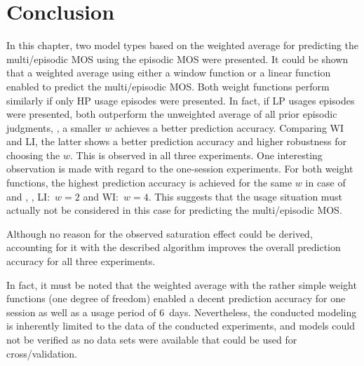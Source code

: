 


\section{Conclusion}
In this chapter, two model types based on the weighted average for predicting the multi\-/episodic \ac{MOS} using the episodic \ac{MOS} were presented.
It could be shown that a weighted average using either a window function or a linear function enabled to predict the multi\-/episodic \ac{MOS}.
Both weight functions perform similarly if only \ac{HP} usage episodes were presented.
In fact, if \ac{LP} usages episodes were presented, both outperform the unweighted average of all prior episodic judgments, \ie, a smaller $\mathit{w}$ achieves a better prediction accuracy.
Comparing WI and LI, the latter shows a better prediction accuracy and higher robustness for choosing the $\mathit{w}$.
This is observed in all three experiments.
One interesting observation is made with regard to the one-session experiments.
For both weight functions, the highest prediction accuracy is achieved for the same $\mathit{w}$ in case of  and \EIIa{}, \ie, LI:~$\mathit{w}=2$ and WI:~$\mathit{w}=4$.
This suggests that the usage situation must actually not be considered in this case for predicting the multi\-/episodic \ac{MOS}.

Although no reason for the observed saturation effect could be derived, accounting for it with the described algorithm improves the overall prediction accuracy for all three experiments.

In fact, it must be noted that the weighted average with the rather simple weight functions (one degree of freedom) enabled a decent prediction accuracy for one session as well as a usage period of 6~days.
Nevertheless, the conducted modeling is inherently limited to the data of the conducted experiments, and models could not be verified as no data sets were available that could be used for cross\-/validation.
